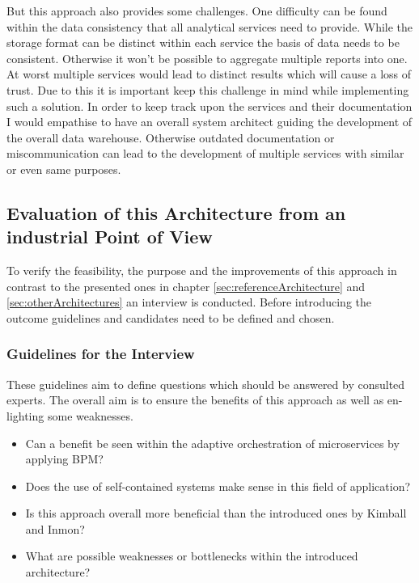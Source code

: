 But this approach also provides some challenges. One difficulty can be found within the data consistency that all analytical services need to provide. While the storage format can be distinct within each service the basis of data needs to be consistent. Otherwise it won't be possible to aggregate multiple reports into one. At worst multiple services would lead to distinct results which will cause a loss of trust. Due to this it is important keep this challenge in mind while implementing such a solution. \newline
In order to keep track upon the services and their documentation I would empathise to have an overall system architect guiding the development of the overall data warehouse. Otherwise outdated documentation or miscommunication can lead to the development of multiple services with similar or even same purposes. 

\subsection{Evaluation of this Architecture from an industrial Point of View}
To verify the feasibility, the purpose and the improvements of this approach in contrast to the presented ones in chapter \ref{sec:referenceArchitecture} and \ref{sec:otherArchitectures} an interview is conducted. Before introducing the outcome guidelines and candidates need to be defined and chosen.

\subsubsection{Guidelines for the Interview}
These guidelines aim to define questions which should be answered by consulted experts. The overall aim is to ensure the benefits of this approach as well as en-lighting some weaknesses. 
\begin{itemize}
    \item Can a benefit be seen within the adaptive orchestration of microservices by applying BPM?
    \item Does the use of self-contained systems make sense in this field of application?
    \item Is this approach overall more beneficial than the introduced ones by Kimball and Inmon?
    \item What are possible weaknesses or bottlenecks within the introduced architecture?
\end{itemize}

